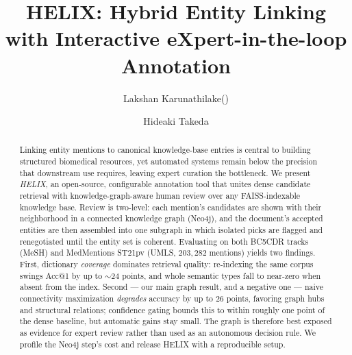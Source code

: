\documentclass[runningheads]{llncs}
\begin{document}
\title{\textbf{HELIX}: \textmd{\textbf{H}ybrid \textbf{E}ntity
       \textbf{L}inking with \textbf{I}nteractive
       e\textbf{X}pert-in-the-loop Annotation}}

\author{Lakshan Karunathilake(\Letter) \and
Hideaki Takeda}

\maketitle

\begin{abstract}
Linking entity mentions to canonical knowledge-base entries is central to
building structured biomedical resources, yet automated systems remain below the
precision that downstream use requires, leaving expert curation the bottleneck.
We present \emph{HELIX}, an open-source, configurable annotation tool that unites
dense candidate retrieval with knowledge-graph-aware human review over any
FAISS-indexable knowledge base. Review is two-level: each mention's candidates are
shown with their neighborhood in a connected knowledge graph (Neo4j), and the
document's accepted entities are then assembled into one subgraph in which isolated
picks are flagged and renegotiated until the entity set is coherent. Evaluating on
both BC5CDR tracks (MeSH) and MedMentions ST21pv (UMLS, $203{,}282$ mentions) yields
two findings. First, dictionary \emph{coverage} dominates retrieval quality:
re-indexing the same corpus swings Acc@1 by up to ${\sim}24$ points, and whole
semantic types fall to near-zero when absent from the index. Second --- our main
graph result, and a negative one --- naive connectivity maximization \emph{degrades}
accuracy by up to $26$ points, favoring graph hubs and structural relations;
confidence gating bounds this to within roughly one point of the dense baseline, but
automatic gains stay small. The graph is therefore best exposed as evidence for
expert review rather than used as an autonomous decision rule. We profile the Neo4j
step's cost and release HELIX with a reproducible setup.

\end{abstract}
\end{document}
